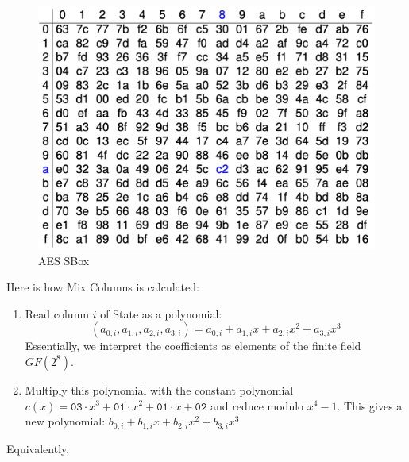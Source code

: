 \documentclass[12pt,titlepage]{article}
\begin{document}
\begin{center}
	\begin{figure}[h!]
		\includegraphics[width=\textwidth]{AES_S_Box.png}
		\caption{AES SBox}
	\end{figure}
\end{center}

Here is how Mix Columns is calculated: \begin{enumerate}
\item Read column $i$ of Sta\textbf{}te as a polynomial: $$(a_{0,i}, a_{1,i} , a_{2,i} , a_{3,i}) = a_{0,i} + a_{1,i} x + a_{2,i} x^2 + a_{3,i} x^3$$ Essentially, we interpret the coefficients as elements of the finite field $GF(2^8)$.
\item Multiply this polynomial with the constant polynomial $c(x) = \texttt{03} \cdot x^3 + \texttt{01} \cdot x^2 + \texttt{01} \cdot x + \texttt{02}$ and reduce modulo $x^4 - 1$. This gives a new polynomial: $b_{0,i} + b_{1,i} x + b_{2,i} x^2 + b_{3,i} x^3$
\end{enumerate}
Equivalently, 
\end{document}
